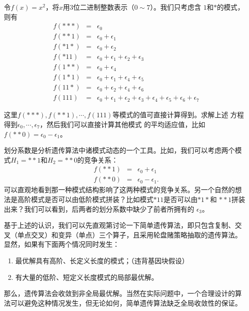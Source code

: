 \begin{example}
  令$f(x) = x^2$，将$x$用$3$位二进制整数表示（$0 \sim 7$）。我们只考虑含
  $1$和$*$的模式，则有
  \begin{eqnarray*}
    f(***) & = & \epsilon_0\\
    f(**1) & = & \epsilon_0 + \epsilon_1 \\
    f(*1*) & = & \epsilon_0 + \epsilon_2 \\
    f(*11) & = & \epsilon_0 + \epsilon_1 + \epsilon_2 + \epsilon_3 \\
    f(1**) & = & \epsilon_0 + \epsilon_4\\
    f(1*1) & = & \epsilon_0 + \epsilon_1 + \epsilon_4 + \epsilon_5\\
    f(11*) & = & \epsilon_0 + \epsilon_2 + \epsilon_4 + \epsilon_6\\
    f(111) & = & \epsilon_0 + \epsilon_1 + \epsilon_2 + \epsilon_3 + \epsilon_4 + \epsilon_5 + \epsilon_6 + \epsilon_7
  \end{eqnarray*}

这里$f(***), f(**1), \cdots, f(111)$等模式的值可直接计算得到。求解上述
方程得到$\epsilon_0, \cdots, \epsilon_7$，然后我们可以直接计算其他模式
的平均适应值，比如$f(**0) = \epsilon_0 - \epsilon_1$。
\end{example}

划分系数是分析遗传算法中诸模式动态的一个工具。比如，我们可以考虑两个模
式$H_1 = **1$和$H_2=**0$的竞争关系：
\begin{eqnarray*}
  f(**1) & = & \epsilon_0 + \epsilon_1\\
  f(**0) & = & \epsilon_0 - \epsilon_1.
\end{eqnarray*}
可以直观地看到那一种模式结构影响了这两种模式的竞争关系。另一个自然的想
法是高阶模式是否可以由低阶模式拼装？比如模式$*11$是否可以由$*1*$和
$**1$拼装出来？我们可以看到，后两者的划分系数中缺少了前者所拥有的
$\epsilon_3$。

基于上述的认识，我们可以先直观第讨论一下简单遗传算法，即只包含复制、交
叉（单点交叉）和变异（单点）三个算子，且采用轮盘赌策略抽取的遗传算法。
显然，如果有下面两个情况同时发生：
\begin{enumerate}
  \item 最优解具有高阶、长定义长度的模式；（违背基因块假设）
  \item 有大量的低阶、短定义长度模式的局部最优解。
\end{enumerate}
那么，遗传算法会收敛到非全局最优解。当然在实际问题中，一个合理设计的算
法可以避免这种情况发生，但无论如何，简单遗传算法缺乏全局收敛性的保证。
